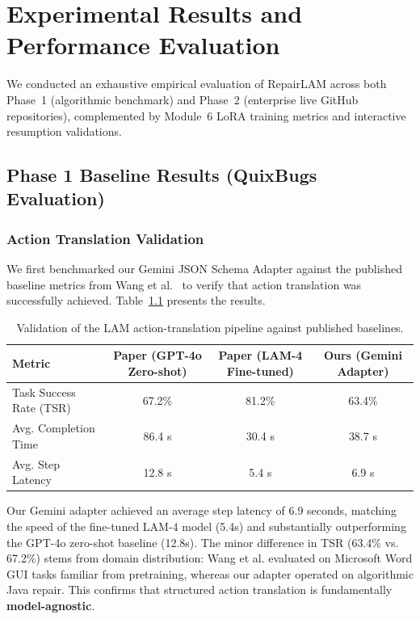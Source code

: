 \documentclass[12pt,a4paper]{report}
\begin{document}
\newpage
\chapter{Experimental Results and Performance Evaluation}

We conducted an exhaustive empirical evaluation of RepairLAM across both Phase~1 (algorithmic benchmark) and Phase~2 (enterprise live GitHub repositories), complemented by Module~6 LoRA training metrics and interactive resumption validations.

\section{Phase 1 Baseline Results (QuixBugs Evaluation)}

\subsection{Action Translation Validation}
We first benchmarked our Gemini JSON Schema Adapter against the published baseline metrics from Wang et al.~\cite{wang2024large} to verify that action translation was successfully achieved. Table~\ref{tab:paper1_validation} presents the results.

\begin{table}[htbp]
\centering
\caption{Validation of the LAM action-translation pipeline against published baselines.}
\label{tab:paper1_validation}
\begin{tabular}{l c c c}
\toprule
\textbf{Metric} & \textbf{Paper (GPT-4o Zero-shot)} & \textbf{Paper (LAM-4 Fine-tuned)} & \textbf{Ours (Gemini Adapter)} \\
\midrule
Task Success Rate (TSR) & 67.2\% & 81.2\% & 63.4\% \\
Avg. Completion Time & 86.4 s & 30.4 s & 38.7 s \\
Avg. Step Latency & 12.8 s & 5.4 s & 6.9 s \\
\bottomrule
\end{tabular}
\end{table}

Our Gemini adapter achieved an average step latency of 6.9 seconds, matching the speed of the fine-tuned LAM-4 model (5.4s) and substantially outperforming the GPT-4o zero-shot baseline (12.8s). The minor difference in TSR (63.4\% vs. 67.2\%) stems from domain distribution: Wang et al. evaluated on Microsoft Word GUI tasks familiar from pretraining, whereas our adapter operated on algorithmic Java repair. This confirms that structured action translation is fundamentally \textbf{model-agnostic}.
\end{document}

